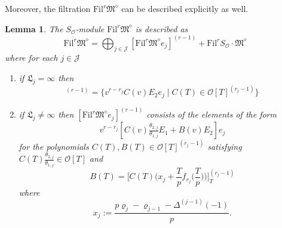 \documentclass[11pt]{amsart}
\theoremstyle{definition}
\numberwithin{equation}{subsection}
\theoremstyle{plain}
\theoremstyle{plain}
\theoremstyle{plain}
\theoremstyle{plain}
\theoremstyle{plain}
\theoremstyle{plain}
\theoremstyle{plain}
\theoremstyle{plain}
\theoremstyle{plain}
\newtheorem{lemm}[equation]{Lemma}
\theoremstyle{plain}
\theoremstyle{plain}
\theoremstyle{plain}
\theoremstyle{definition}
\theoremstyle{definition}
\theoremstyle{definition}
\theoremstyle{remark}
\renewcommand{\(}{\textup{(}}
\renewcommand{\)}{\textup{)}}
\newcommand{\fM}{\mathfrak{M}}
\newcommand{\fL}{\mathfrak{L}}
\newcommand{\Fil}{\mathrm{Fil}}
\newcommand{\cO}{\mathcal{O}}
\newcommand{\cJ}{\mathcal{J}}
\begin{document}
Moreover, the filtration $\Fil^r\fM^\diamond$ can be described explicitly as well.
\begin{lemm}\label{lemm: filtration of fM^diamond}
The $S_\cO$-module $\Fil^r\fM^\diamond$ is described as 
\begin{equation}\label{eq: computation of filtration}
\Fil^r\fM^\diamond =\bigoplus_{j\in\cJ}[\Fil^r\fM^{\diamond}e_j]^{(r-1)}+\Fil^rS_\cO\cdot\fM^\diamond
\end{equation}
where for each $j\in\cJ$ 
\begin{enumerate}[leftmargin=*]
\item if $\fL_j=\infty$ then
\begin{equation*}
[\Fil^r\fM^{\diamond}e_j]^{(r-1)}= \big\{v^{r-r_j}C(v)E_2e_j \mid C(T)\in\cO[T]^{(r_j-1)}\big\}
\end{equation*} 
\item if $\fL_j\neq \infty$ then
$[\Fil^r\fM^{\diamond}e_j]^{(r-1)}$ consists of the elements of the form
$$v^{r-r_j}[C(v)\tfrac{\theta_{2,j}}{\theta_{1,j}} E_1+B(v)E_2]e_j$$
for the polynomials $C(T),B(T)\in\cO[T]^{(r_j-1)}$ satisfying $C(T)\tfrac{\theta_{2,j}}{\theta_{1,j}}\in\cO[T]$ and
\begin{equation}\label{eq: equation for C and B}
B(T)=\bigg[C(T)\bigg(x_j+\frac{T}{p}f_{r_j}\Big(\frac{T}{p}\Big) \bigg)\bigg]_{T}^{(r_j-1)}
\end{equation}
where
\begin{equation}\label{eq: definition of x}
x_j:=\frac{p\varrho_j-\varrho_{j-1}-\Delta^{(j-1)}(-1)}{p}.
\end{equation}
\end{enumerate}
\end{lemm}
\end{document}
